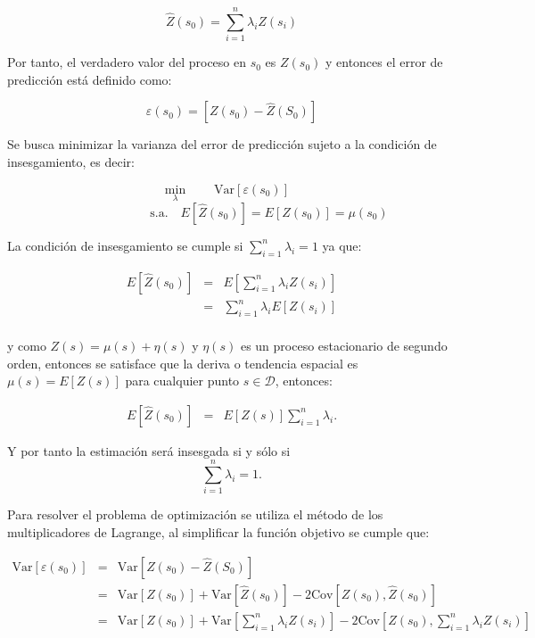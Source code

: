 \documentclass[11pt, oneside]{book}
\begin{document}
$$\hat{Z}(s_0)=\sum_{i=1}^n\lambda_i Z(s_i)$$

\bigskip

Por tanto, el verdadero valor del proceso en $s_0$ es $Z(s_0)$ y entonces el error de predicción está definido como:

$$\varepsilon(s_0) = [Z(s_0)-\hat{Z}(S_0)]$$

\bigskip

Se busca minimizar la varianza del error de predicción sujeto a la condición de insesgamiento, es decir:

$$ \min_{\lambda} \quad \quad \textrm{Var}[\varepsilon(s_0)]\quad $$
$$ \quad \quad \quad \quad \quad \quad \textrm{s.a.} \quad E[\hat{Z}(s_0)] = E[Z(s_0)] = \mu(s_0) $$

\bigskip

La condición de insesgamiento se cumple si $\sum_{i=1}^n\lambda_i=1$ ya que:

\begin{eqnarray*}
  E[\hat{Z}(s_0)] & = & E\left[ \sum_{i=1}^n \lambda_i Z(s_i) \right] \\
                  & = & \sum_{i=1}^n \lambda_i E[Z(s_i)] \\ 
 \end{eqnarray*}
 
\noindent y como $Z(s) = \mu(s) + \eta(s)$ y $\eta(s)$ es un proceso estacionario de segundo orden, entonces se satisface que la deriva o tendencia espacial es $\mu(s) = E[Z(s)]$ para cualquier punto $s \in \mathcal{D}$, entonces:

\begin{eqnarray*}
  E[\hat{Z}(s_0)] & = & E[Z(s)] \sum_{i=1}^n\lambda_i.
\end{eqnarray*}

\bigskip

Y por tanto la estimación será insesgada si y sólo si $$\sum_{i=1}^n\lambda_i=1.$$

\bigskip

Para resolver el problema de optimización se utiliza el método de los multiplicadores de Lagrange, al simplificar la función objetivo se cumple que:

\begin{eqnarray*}
  \textrm{Var}[\varepsilon(s_0)] & = & \textrm{Var}[Z(s_0)-\hat{Z}(S_0)] \\
                                 & = & \textrm{Var}[Z(s_0)] + \textrm{Var}[\hat{Z}(s_0)]-2\textrm{Cov}[Z(s_0),\hat{Z}(s_0)]\\ 
                                 & = & \textrm{Var}[Z(s_0)] + \textrm{Var}\left[\sum_{i=1}^n\lambda_iZ(s_i)\right]-2\textrm{Cov}\left[Z(s_0),\sum_{i=1}^n\lambda_iZ(s_i)\right]\\                                  
 \end{eqnarray*}
\end{document}
